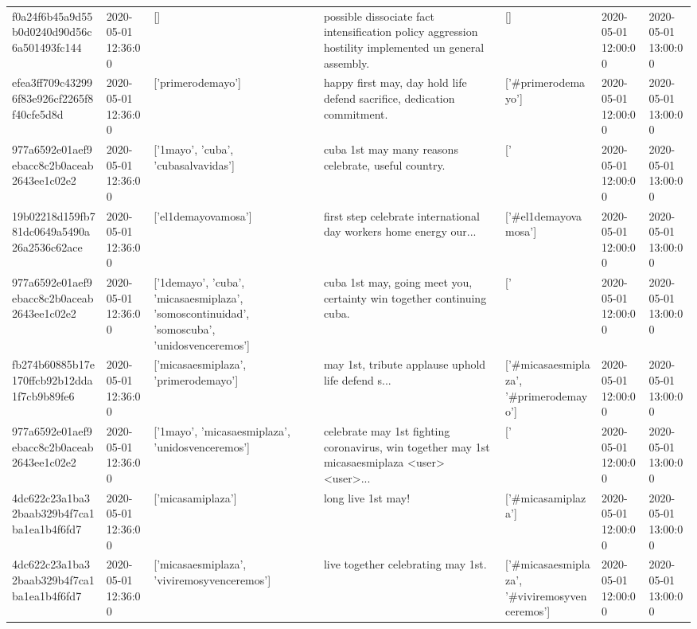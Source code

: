 \begin{tabular}{lllllll}
f0a24f6b45a9d55b0d0240d90d56c6a501493fc144 & 2020-05-01 12:36:00 & [] & possible dissociate fact intensification policy aggression hostility implemented un general assembly. & [] & 2020-05-01 12:00:00 & 2020-05-01 13:00:00 \\
efea3ff709c432996f83e926cf2265f8f40cfe5d8d & 2020-05-01 12:36:00 & ['primerodemayo'] & happy first may, day hold life defend sacrifice, dedication commitment. & ['#primerodemayo'] & 2020-05-01 12:00:00 & 2020-05-01 13:00:00 \\
977a6592e01aef9ebacc8c2b0aceab2643ee1c02e2 & 2020-05-01 12:36:00 & ['1mayo', 'cuba', 'cubasalvavidas'] & cuba 1st may many reasons celebrate, useful country. & ['#1mayo', '#cuba', '#cubasalvavidas'] & 2020-05-01 12:00:00 & 2020-05-01 13:00:00 \\
19b02218d159fb781dc0649a5490a26a2536c62ace & 2020-05-01 12:36:00 & ['el1demayovamosa'] & first step celebrate international day workers home energy our... & ['#el1demayovamosa'] & 2020-05-01 12:00:00 & 2020-05-01 13:00:00 \\
977a6592e01aef9ebacc8c2b0aceab2643ee1c02e2 & 2020-05-01 12:36:00 & ['1demayo', 'cuba', 'micasaesmiplaza', 'somoscontinuidad', 'somoscuba', 'unidosvenceremos'] & cuba 1st may, going meet you, certainty win together continuing cuba. & ['#1demayo', '#cuba', '#micasaesmiplaza', '#somoscontinuidad', '#somoscuba', '#unidosvenceremos'] & 2020-05-01 12:00:00 & 2020-05-01 13:00:00 \\
fb274b60885b17e170ffcb92b12dda1f7cb9b89fe6 & 2020-05-01 12:36:00 & ['micasaesmiplaza', 'primerodemayo'] & may 1st, tribute applause uphold life defend s... & ['#micasaesmiplaza', '#primerodemayo'] & 2020-05-01 12:00:00 & 2020-05-01 13:00:00 \\
977a6592e01aef9ebacc8c2b0aceab2643ee1c02e2 & 2020-05-01 12:36:00 & ['1mayo', 'micasaesmiplaza', 'unidosvenceremos'] & celebrate may 1st fighting coronavirus, win together may 1st micasaesmiplaza <user> <user>... & ['#1mayo', '#micasaesmiplaza', '#unidosvenceremos'] & 2020-05-01 12:00:00 & 2020-05-01 13:00:00 \\
4dc622c23a1ba32baab329b4f7ca1ba1ea1b4f6fd7 & 2020-05-01 12:36:00 & ['micasamiplaza'] & long live 1st may! & ['#micasamiplaza'] & 2020-05-01 12:00:00 & 2020-05-01 13:00:00 \\
4dc622c23a1ba32baab329b4f7ca1ba1ea1b4f6fd7 & 2020-05-01 12:36:00 & ['micasaesmiplaza', 'viviremosyvenceremos'] & live together celebrating may 1st. & ['#micasaesmiplaza', '#viviremosyvenceremos'] & 2020-05-01 12:00:00 & 2020-05-01 13:00:00 \\

\end{tabular}
